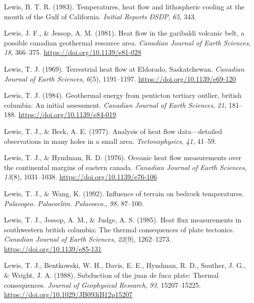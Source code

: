 \begin{CSLReferences}{1}{1}
\leavevmode{}%
Lewis, B. T. R. (1983). Temperatures, heat flow and lithospheric cooling at the mouth of the {Gulf of California}. \emph{Initial Reports DSDP}, \emph{65}, 343.

\leavevmode{}%
Lewis, J. F., \& Jessop, A. M. (1981). Heat flow in the garibaldi volcanic belt, a possible canadian geothermal resource area. \emph{Canadian Journal of Earth Sciences}, \emph{18}, 366--375. \url{https://doi.org/10.1139/e81-028}

\leavevmode{}%
Lewis, T. J. (1969). Terrestrial heat flow at {Eldorado, Saskatchewan}. \emph{Canadian Journal of Earth Sciences}, \emph{6}(5), 1191--1197. \url{https://doi.org/10.1139/e69-120}

\leavevmode{}%
Lewis, T. J. (1984). Geothermal energy from penticton tertiary outlier, british columbia: An initial assessment. \emph{Canadian Journal of Earth Sciences}, \emph{21}, 181--188. \url{https://doi.org/10.1139/e84-019}

\leavevmode{}%
Lewis, T. J., \& Beck, A. E. (1977). Analysis of heat flow data---detailed observations in many holes in a small area. \emph{Tectonophysics}, \emph{41}, 41--59.

\leavevmode{}%
Lewis, T. J., \& Hyndman, R. D. (1976). Oceanic heat flow measurements over the continental margins of eastern canada. \emph{Canadian Journal of Earth Sciences}, \emph{13}(8), 1031--1038. \url{https://doi.org/10.1139/e76-106}

\leavevmode{}%
Lewis, T. J., \& Wang, K. (1992). Influence of terrain on bedrock temperatures. \emph{Palaeogeo. Palaeoclim. Palaeoeco.}, \emph{98}, 87--100.

\leavevmode{}%
Lewis, T. J., Jessop, A. M., \& Judge, A. S. (1985). Heat flux measurements in southwestern british columbia: The thermal consequences of plate tectonics. \emph{Canadian Journal of Earth Sciences}, \emph{22}(9), 1262--1273. \url{https://doi.org/10.1139/e85-131}

\leavevmode{}%
Lewis, T. J., Bentkowski, W. H., Davis, E. E., Hyndman, R. D., Souther, J. G., \& Wright, J. A. (1988). Subduction of the juan de fuca plate: Thermal consequences. \emph{Journal of Geophysical Research}, \emph{93}, 15207--15225. \url{https://doi.org/10.1029/JB093iB12p15207}


\end{CSLReferences}
